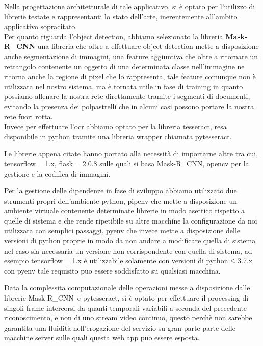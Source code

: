 \documentclass[12pt,a4paper]{article}
\newcommand{\mrcnn}{Mask-R\_CNN}
\begin{document}
Nella progettazione architetturale di tale applicativo, si è optato per
l'utilizzo di librerie testate e rappresentanti lo stato dell'arte,
inerentemente all'ambito applicativo sopracitato.\\
Per quanto riguarda l'object detection, abbiamo selezionato la libreria
\textbf{\mrcnn} una libreria che oltre a effettuare object detection mette a
disposizione anche segmentazione di immagini, una feature aggiuntiva che
oltre a ritornare un rettangolo contenente un oggetto di una determinata
classe nell'immagine ne ritorna anche la regione di pixel che lo
rappresenta, tale feature comunque non è utilizzata nel nostro sistema,
ma è tornata utile in fase di training in quanto possiamo allenare la
nostra rete direttamente tramite i segmenti di documenti, evitando la
presenza dei polpastrelli che in alcuni casi possono portare la nostra
rete fuori rotta.\\
Invece per effettuare l'ocr abbiamo optato per la libreria tesseract,
resa disponibile in python tramite una libreria wrapper chiamata
pytesseract.

Le librerie appena citate hanno portato alla necessità di importarne
altre tra cui, tensorflow$=$1.x, flask$=$2.0.8 sulle quali si basa
\mrcnn, opencv per la gestione e la codifica di immagini.

Per la gestione delle dipendenze in fase di sviluppo abbiamo utilizzato
due strumenti propri dell'ambiente python, pipenv che mette a
disposizione un ambiente virtuale contenente determinate librerie in
modo asettico rispetto a quelle di sistema e che rende ripetibile su
altre macchine la configurazione da noi utilizzata con semplici
passaggi. pyenv che invece mette a disposizione delle versioni di python
proprie in modo da non andare a modificare quella di sistema nel caso
sia necessaria un versione non corrispondente con quella di sistema, ad
esempio tensorflow$=$1.x è utilizzabile solamente con versioni di
python$\leq$3.7.x con pyenv tale requisito puo essere soddisfatto su
qualsiasi macchina.

Data la complessita computazionale delle operazioni messe a disposizione
dalle librerie \mrcnn\ e pytesseract, si è optato per effettuare il
processing di singoli frame intercorsi da quanti temporali variabili a
seconda del precedente riconoscimento, e non di uno stream video
continuo, questo perchè non sarebbe garantita una fluidità
nell'erogazione del servizio su gran parte parte delle macchine server
sulle quali questa web app puo essere esposta.
\end{document}
